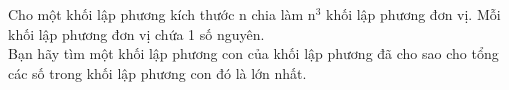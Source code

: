 Cho một khối lập phương kích thước n chia làm n$^3 $ khối lập phương đơn vị. Mỗi khối lập phương đơn vị chứa 1 số nguyên.
\\Bạn hãy tìm một khối lập phương con của khối lập phương đã cho sao cho tổng các số trong khối lập phương con đó là lớn nhất.

\
